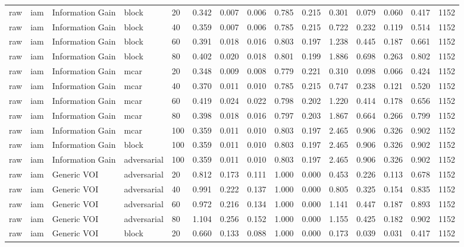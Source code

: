 \begin{table}[!ht]
{\begin{tabular}{lllllllllllllll}
raw & iam & Information Gain & block & 20 & 0.342 & 0.007 & 0.006 & 0.785 & 0.215 & 0.301 & 0.079 & 0.060 & 0.417 & 1152 \\
raw & iam & Information Gain & block & 40 & 0.359 & 0.007 & 0.006 & 0.785 & 0.215 & 0.722 & 0.232 & 0.119 & 0.514 & 1152 \\
raw & iam & Information Gain & block & 60 & 0.391 & 0.018 & 0.016 & 0.803 & 0.197 & 1.238 & 0.445 & 0.187 & 0.661 & 1152 \\
raw & iam & Information Gain & block & 80 & 0.402 & 0.020 & 0.018 & 0.801 & 0.199 & 1.886 & 0.698 & 0.263 & 0.802 & 1152 \\
raw & iam & Information Gain & mcar & 20 & 0.348 & 0.009 & 0.008 & 0.779 & 0.221 & 0.310 & 0.098 & 0.066 & 0.424 & 1152 \\
raw & iam & Information Gain & mcar & 40 & 0.370 & 0.011 & 0.010 & 0.785 & 0.215 & 0.747 & 0.238 & 0.121 & 0.520 & 1152 \\
raw & iam & Information Gain & mcar & 60 & 0.419 & 0.024 & 0.022 & 0.798 & 0.202 & 1.220 & 0.414 & 0.178 & 0.656 & 1152 \\
raw & iam & Information Gain & mcar & 80 & 0.398 & 0.018 & 0.016 & 0.797 & 0.203 & 1.867 & 0.664 & 0.266 & 0.799 & 1152 \\
raw & iam & Information Gain & mcar & 100 & 0.359 & 0.011 & 0.010 & 0.803 & 0.197 & 2.465 & 0.906 & 0.326 & 0.902 & 1152 \\
raw & iam & Information Gain & block & 100 & 0.359 & 0.011 & 0.010 & 0.803 & 0.197 & 2.465 & 0.906 & 0.326 & 0.902 & 1152 \\
raw & iam & Information Gain & adversarial & 100 & 0.359 & 0.011 & 0.010 & 0.803 & 0.197 & 2.465 & 0.906 & 0.326 & 0.902 & 1152 \\
raw & iam & Generic VOI & adversarial & 20 & 0.812 & 0.173 & 0.111 & 1.000 & 0.000 & 0.453 & 0.226 & 0.113 & 0.678 & 1152 \\
raw & iam & Generic VOI & adversarial & 40 & 0.991 & 0.222 & 0.137 & 1.000 & 0.000 & 0.805 & 0.325 & 0.154 & 0.835 & 1152 \\
raw & iam & Generic VOI & adversarial & 60 & 0.972 & 0.216 & 0.134 & 1.000 & 0.000 & 1.141 & 0.447 & 0.187 & 0.893 & 1152 \\
raw & iam & Generic VOI & adversarial & 80 & 1.104 & 0.256 & 0.152 & 1.000 & 0.000 & 1.155 & 0.425 & 0.182 & 0.902 & 1152 \\
raw & iam & Generic VOI & block & 20 & 0.660 & 0.133 & 0.088 & 1.000 & 0.000 & 0.173 & 0.039 & 0.031 & 0.417 & 1152 \\

\end{tabular}}
\end{table}
